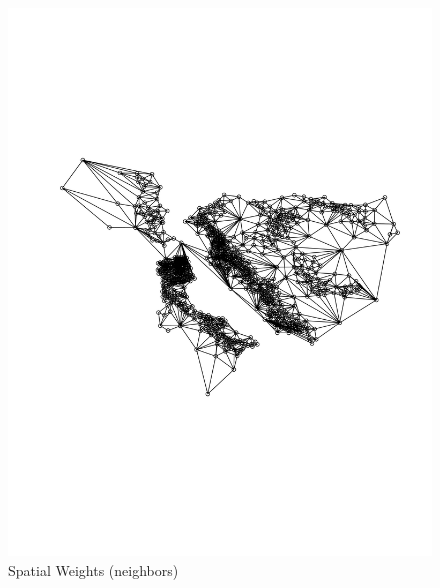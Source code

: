 \documentclass[10pt, letterpaper]{amsart}
\begin{document}
\begin{figure}[!htbp]
  \caption{Spatial Weights (neighbors)}
  \includegraphics[scale=0.1]{Spatial_Weight_Matrix}
\end{figure}
\end{document}
